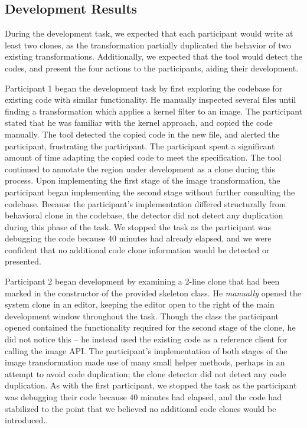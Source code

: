\documentclass[nocopyrightspace,10pt]{sigplanconf}
\begin{document}
\subsection{Development Results}
During the development task, we expected that each participant would
write at least two clones, as the transformation partially duplicated
the behavior of two existing transformations. Additionally, we
expected that the tool would detect the codes, and present the four
actions to the participants, aiding their development.

Participant 1 began the development task by first exploring the
codebase for existing code with similar functionality. He manually
inspected several files until finding a transformation which applies a
kernel filter to an image. The participant stated that he was familiar
with the kernel approach, and copied the code manually. The tool
detected the copied code in the new file, and alerted the participant,
frustrating the participant. The participant spent a significant amount of time adapting
the copied code to meet the specification. The tool continued to annotate the region
under development as a clone during this process.
Upon implementing the first stage of the image
transformation, the participant began implementing the second stage
without further consulting the codebase. Because the participant's
implementation differed structurally from behavioral clone in the
codebase, the detector did not detect any duplication during this
phase of the task. We stopped the task as the participant was
debugging the code because 40 minutes had already elapsed, and we were
confident that no additional code clone information would be detected
or presented.

Participant 2 began development by examining a 2-line clone that had
been marked in the constructor of the provided skeleton class.  He
\textit{manually} opened the system clone in an editor, keeping the
editor open to the right of the main development window throughout the
task. Though the class the participant opened contained the
functionality required for the second stage of the clone, he did not
notice this -- he instead used the existing code as a reference client
for calling the image API. The participant's implementation of both
stages of the image transformation made use of many small helper
methods, perhaps in an attempt to avoid code duplication; the clone
detector did not detect any code duplication. As with the first
participant, we stopped the task as the participant was debugging
their code because 40 minutes had elapsed, and the code had stabilized
to the point that we believed no additional code clones would be
introduced..
\end{document}
